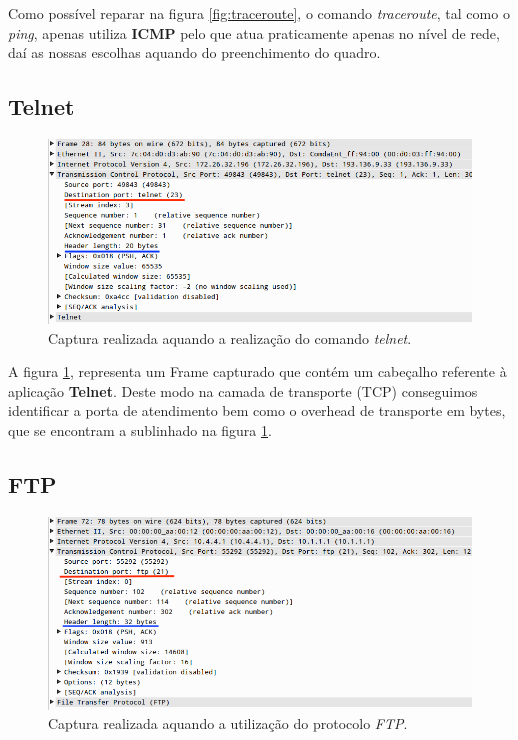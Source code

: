 \documentclass{llncs}
\begin{document}
Como possível reparar na figura \ref{fig:traceroute}, o comando \emph{traceroute}, tal como o \emph{ping}, apenas utiliza \textbf{ICMP} pelo que atua praticamente apenas no nível de rede, daí as nossas escolhas aquando do preenchimento do quadro.


\subsection{Telnet}

\begin{figure}[H]
\begin{center}
\includegraphics[scale=0.4]{telnet.png}
\end{center}
\caption{\label{fig:telnet}Captura realizada aquando a realização do comando \emph{telnet}.}
\end{figure}

A figura \ref{fig:telnet}, representa um Frame capturado que contém um cabeçalho referente à aplicação \textbf{Telnet}. Deste modo na camada de transporte (TCP) conseguimos identificar a porta de atendimento bem como o overhead de transporte em bytes, que se encontram a sublinhado na figura \ref{fig:telnet}.


\subsection{FTP}

\begin{figure}[H]
\begin{center}
\includegraphics[scale=0.4]{ftp.png}
\end{center}
\caption{\label{fig:ftp}Captura realizada aquando a utilização do protocolo \emph{FTP}.}
\end{figure}
\end{document}
